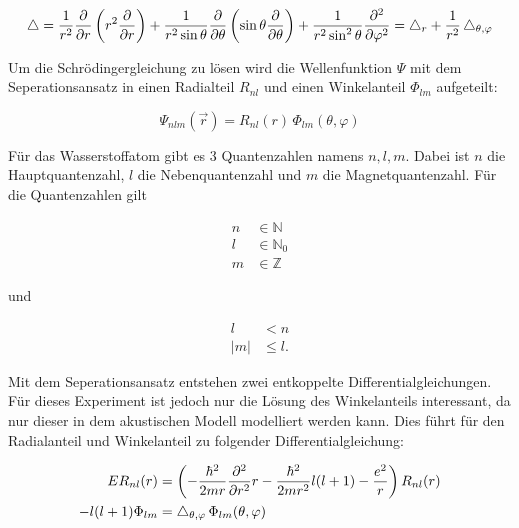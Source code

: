 \begin{equation}
    \mathop{}\!\mathbin\bigtriangleup = \frac{1}{r^2} \frac{\partial}{\partial r} \left( r^2 \frac{\partial}{\partial r} \right) + \frac{1}{r^2 \sin \theta} \frac{\partial}{\partial \theta} \left( \sin \theta \frac{\partial}{\partial \theta} \right) + \frac{1}{r^2 \sin^2 \theta} \frac{\partial^2}{\partial \varphi^2} = \mathop{}\!\mathbin\bigtriangleup_r + \frac{1}{r^2} \mathop{}\!\mathbin\bigtriangleup_{\theta, \varphi}
    \label{eqn:laplace}
\end{equation}

Um die Schrödingergleichung zu lösen wird die Wellenfunktion $\Psi$ mit dem Seperationsansatz in einen Radialteil $R_{nl}$ und einen Winkelanteil $\Phi_{lm}$ aufgeteilt:

\begin{equation}
    \Psi_{nlm} (\vec{r}) = R_{nl}(r) \, \Phi_{lm}(\theta, \varphi)
    \label{eqn:seperation}
\end{equation}

Für das Wasserstoffatom gibt es 3 Quantenzahlen namens $n, l, m$. Dabei ist $n$ die Hauptquantenzahl, $l$ die Nebenquantenzahl und $m$ die Magnetquantenzahl. Für die Quantenzahlen gilt

\begin{align*}
    n &\in \mathbb{N} \\
    l &\in \mathbb{N}_0 \\
    m &\in \mathbb{Z}
\end{align*}

und

\begin{align*}
    l &< n \\
    |m| &\leq l .
\end{align*}

Mit dem Seperationsansatz entstehen zwei entkoppelte Differentialgleichungen. Für dieses Experiment ist jedoch nur die Lösung des Winkelanteils interessant, da nur dieser in dem akustischen Modell modelliert werden kann. Dies führt für den Radialanteil und Winkelanteil zu folgender Differentialgleichung:

\begin{align}
    E R_{nl}(r) &= \left( - \frac{\hbar^2}{2mr} \frac{\partial^2}{\partial r^2} r - \frac{\hbar^2}{2mr^2} l(l+1) - \frac{e^2}{r} \right) R_{nl}(r)
    \label{eqn:radial_DGL} \\
    - l (l+1) \Phi_{lm} &= \mathop{}\!\mathbin\bigtriangleup_{\theta, \varphi} \, \Phi_{lm} (\theta, \varphi) 
    \label{eqn:winkel_DGL}
\end{align}

